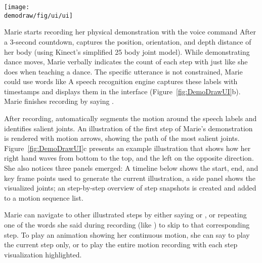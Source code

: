 \begin{figure*}[!t]
  \centering
  \texttt{[image: \\demodraw/fig/ui/ui]}
  \caption{\systemname{} authoring UI: Using the \phaseI{}, an author sees an avatar following her real-time movement (a). During recording (initiated by voice command ``Start''), real-time feedback shows the speech labels (b). Once a recording is completed by voice command ``Stop'', the motion visualization and a timeline are immediately available (c) for the author to review, and a step-by-step overview will be generated.}
  \label{fig:DemoDrawUI}
\end{figure*}

Marie starts recording her physical demonstration with the voice command  After a 3-second countdown, \systemname{} captures the position, orientation, and depth distance of her body (using Kinect's simplified 25 body joint model).
%
While demonstrating dance moves, Marie verbally indicates the count of each step with  just like she does when teaching a dance. The specific utterance is not constrained, Marie could use words like  A speech recognition engine captures these labels with timestamps and displays them in the interface (Figure~\ref{fig:DemoDrawUI}b).
Marie finishes recording by saying .

After recording, \systemname{} automatically segments the motion around the speech labels and identifies salient joints. An illustration of the first step of Marie's demonstration is rendered with motion arrows, showing the path of the most salient joints. Figure~\ref{fig:DemoDrawUI}c presents an example illustration that shows how her right hand waves from bottom to the top, and the left on the opposite direction. She also notices three panels emerged: A timeline below shows the start, end, and key frame points used to generate the current illustration, a side panel shows the visualized joints; an step-by-step overview of step snapshots is created and added to a motion sequence list.

\clearpage

Marie can navigate to other illustrated steps by either saying  or , or repeating one of the words she said during recording (like ) to skip to that corresponding step. To play an animation showing her continuous motion, she can say  to play the current step only, or  to play the entire motion recording with each step visualization highlighted.

